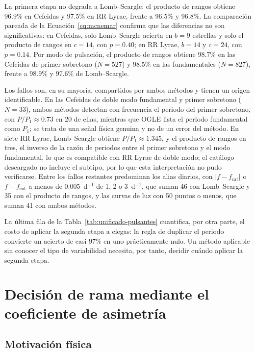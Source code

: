 \documentclass[12pt,letterpaper,oneside]{book}
\begin{document}
La primera etapa no degrada a Lomb--Scargle: el producto de rangos obtiene 96.9\% en Cefeidas y 97.5\% en RR Lyrae, frente a 96.5\% y 96.8\%. La comparaci\'on pareada de la Ecuaci\'on~\eqref{eq:mcnemar} confirma que las diferencias no son significativas: en Cefeidas, solo Lomb--Scargle acierta en $b=9$ estrellas y solo el producto de rangos en $c=14$, con $p=0.40$; en RR Lyrae, $b=14$ y $c=24$, con $p=0.14$. Por modo de pulsaci\'on, el producto de rangos obtiene 98.7\% en las Cefeidas de primer sobretono ($N=527$) y 98.5\% en las fundamentales ($N=827$), frente a 98.9\% y 97.6\% de Lomb--Scargle.

Los fallos son, en su mayor\'ia, compartidos por ambos m\'etodos y tienen un origen identificable. En las Cefeidas de doble modo fundamental y primer sobretono ($N=33$), ambos m\'etodos detectan con frecuencia el periodo del primer sobretono, con $P/P_1\approx0.73$ en 20 de ellas, mientras que OGLE lista el periodo fundamental como $P_1$; se trata de una se\~nal f\'isica genuina y no de un error del m\'etodo. En siete RR Lyrae, Lomb--Scargle obtiene $P/P_1\approx1.345$, y el producto de rangos en tres, el inverso de la raz\'on de periodos entre el primer sobretono y el modo fundamental, lo que es compatible con RR Lyrae de doble modo; el cat\'alogo descargado no incluye el subtipo, por lo que esta interpretaci\'on no pudo verificarse. Entre los fallos restantes predominan los alias diarios, con $|f-f_{\mathrm{cat}}|$ o $f+f_{\mathrm{cat}}$ a menos de $0.005$~d$^{-1}$ de 1, 2 o 3~d$^{-1}$, que suman 46 con Lomb--Scargle y 35 con el producto de rangos, y las curvas de luz con 50 puntos o menos, que suman 41 con ambos m\'etodos.

La \'ultima fila de la Tabla~\ref{tab:unificado-pulsantes} cuantifica, por otra parte, el costo de aplicar la segunda etapa a ciegas: la regla de duplicar el periodo convierte un acierto de casi 97\% en uno pr\'acticamente nulo. Un m\'etodo aplicable sin conocer el tipo de variabilidad necesita, por tanto, decidir cu\'ando aplicar la segunda etapa.

\section{Decisi\'on de rama mediante el coeficiente de asimetr\'ia}
\label{sec:unificado-decision}

\subsection{Motivaci\'on f\'isica}
\end{document}
